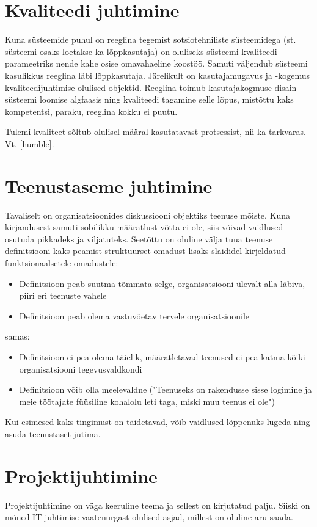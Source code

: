 \documentclass{tufte-book}
\begin{document}
\section{Kvaliteedi juhtimine}
Kuna süsteemide puhul on reeglina tegemist sotsiotehniliste süsteemidega (st. süsteemi osaks loetakse ka lõppkasutaja) on oluliseks süsteemi kvaliteedi parameetriks nende kahe osise omavahaeline koostöö. Samuti väljendub süsteemi kasulikkus reeglina läbi lõppkasutaja. Järelikult on kasutajamugavus ja -kogemus kvaliteedijuhtimise olulised objektid. Reeglina toimub kasutajakogmuse disain süsteemi loomise algfaasis ning kvaliteedi tagamine selle lõpus, mistõttu kaks kompetentsi, paraku, reeglina kokku ei puutu.  

Tulemi kvaliteet sõltub olulisel määral kasutatavast protsessist, nii ka tarkvaras. Vt. \ref{humble}.

\section{Teenustaseme juhtimine}
Tavaliselt on organisatsioonides diskussiooni objektiks teenuse mõiste. Kuna kirjandusest samuti sobilikku määratlust võtta ei ole, siis võivad vaidlused osutuda pikkadeks ja viljatuteks. Seetõttu on oluline välja tuua teenuse definitsiooni kaks peamist struktuurset omadust lisaks slaididel kirjeldatud funktsionaalsetele omadustele:
\begin{itemize}
	\item Definitsioon peab suutma tõmmata selge, organisatsiooni ülevalt alla läbiva, piiri eri teenuste vahele
	\item Definitsioon peab olema vastuvõetav tervele organisatsioonile
\end{itemize}

samas:
\begin{itemize}
	\item Definitsioon ei pea olema täielik, määratletavad teenused ei pea katma kõiki organisatsiooni tegevusvaldkondi
	\item Definitsioon võib olla meelevaldne ("Teenuseks on rakendusse sisse logimine ja meie töötajate füüsiline kohalolu leti taga, miski muu teenus ei ole")
\end{itemize}

Kui esimesed kaks tingimust on täidetavad, võib vaidlused lõppenuks lugeda ning asuda teenustaset jutima.

\section{Projektijuhtimine}
Projektijuhtimine on väga keeruline teema ja sellest on kirjutatud palju. Siiski on mõned IT juhtimise vaatenurgast olulised asjad, millest on oluline aru saada. 
\end{document}

